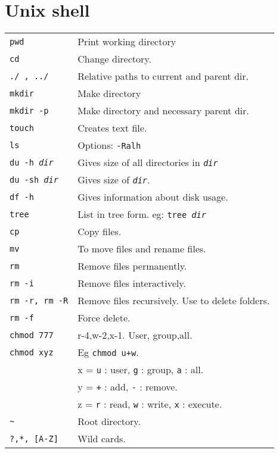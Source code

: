\section{Unix shell}

\begin{tabularx}{\linewidth}{lX}
    \texttt{pwd} & Print working directory\\
    \texttt{cd} & Change directory.\\
    \texttt{./ , ../} & Relative paths to current and parent dir.\\
    \texttt{mkdir} & Make directory\\
    \texttt{mkdir -p} & Make directory and necessary parent dir.\\
    \texttt{touch} & Creates text file. \\
    \texttt{ls} & Options: \texttt{-Ralh} \\
    \texttt{du -h \textit{dir}} & Gives size of all directories in \texttt{\textit{dir}}\\
    \texttt{du -sh \textit{dir}} & Gives size of \texttt{\textit{dir}}.\\
    \texttt{df -h} & Gives information about disk usage.\\
    \texttt{tree} & List in tree form. eg: \texttt{tree \textit{dir}}\\
    \texttt{cp} & Copy files.\\
    \texttt{mv} & To move files and rename files.\\
    \texttt{rm} & Remove files permanently. \\
    \texttt{rm -i} & Remove files interactively. \\
    \texttt{rm -r, rm -R} & Remove files recursively. Use to delete folders.\\
    \texttt{rm -f} & Force delete.\\
    \texttt{chmod 777} & r-4,w-2,x-1. User, group,all.  \\
    \texttt{chmod xyz} & Eg \texttt{chmod u+w}.\\
    & x = \texttt{u} : user, \texttt{g} : group, \texttt{a} : all.\\
    & y = \texttt{+} : add, \texttt{-} : remove.\\
    & z = \texttt{r} : read, \texttt{w} : write, \texttt{x} : execute.\\
    \texttt{\~{}} & Root directory.\\

    \texttt{?,*, [A-Z]} & Wild cards.\\


\end{tabularx}
